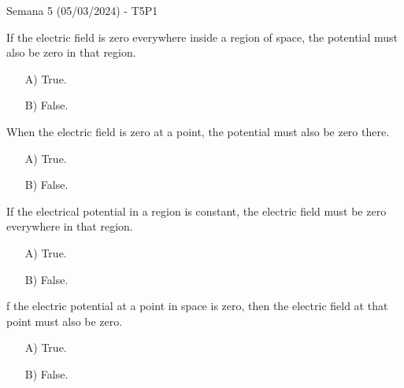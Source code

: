 \begin{frame}{Semana 5 (05/03/2024) - T5P1}
    
    If the electric field is zero everywhere inside a region of space, the potential must also be zero in that region.
    
    \begin{itemize}
        \item[A)] True.
        \item[B)] False.
    \end{itemize}
    
    
    When the electric field is zero at a point, the potential must also be zero there.
    
    \begin{itemize}
        \item[A)] True.
        \item[B)] False.
    \end{itemize}
    
    If the electrical potential in a region is constant, the electric field must be zero everywhere in that region.
    
    \begin{itemize}
        \item[A)] True.
        \item[B)] False.
    \end{itemize}
    
    f the electric potential at a point in space is zero, then the electric field at that point must also be zero.
    
    \begin{itemize}
        \item[A)] True.
        \item[B)] False.
    \end{itemize}
    
\end{frame}

